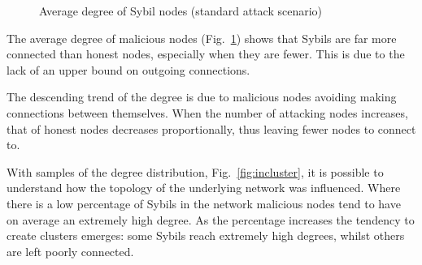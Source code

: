 \begin{figure}[ht]
\begin{minipage}[b]{0.5\linewidth}
			\centering
			\caption{Average degree of Sybil nodes (standard attack scenario)}
			\label{fig:in-atk-degree}
        \end{minipage}
    \end{figure}
    
The average degree of malicious nodes (Fig.~\ref{fig:in-atk-degree}) shows that Sybils are far more connected than honest nodes, especially when they are fewer. This is due to the lack of an upper bound on outgoing connections.

The descending trend of the degree is due to malicious nodes avoiding making connections between themselves. When the number of attacking nodes increases, that of honest nodes decreases proportionally, thus leaving fewer nodes to connect to.

With samples of the degree distribution, Fig.~\ref{fig:incluster}, it is possible to understand how the topology of the underlying network was influenced.  Where there is a low percentage of Sybils in the network malicious nodes tend to have on average an extremely high degree. As the percentage increases the tendency to create clusters emerges: some Sybils reach extremely high degrees, whilst others are left poorly connected.\par


